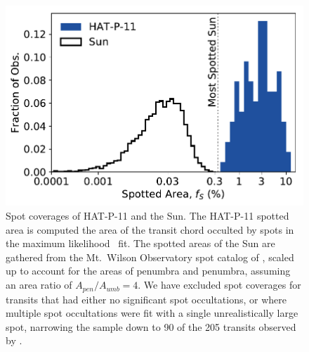 \begin{figure}
\centering
\includegraphics[scale=0.6]{stsp_hat_p_11/spotted_area.pdf}
\caption{Spot coverages of HAT-P-11 and the Sun. The HAT-P-11 spotted area is computed the area of the transit chord occulted by spots in the maximum likelihood \stsp\ fit. The spotted areas of the Sun are gathered from the Mt.~Wilson Observatory spot catalog of \citet{Howard1984}, scaled up to account for the areas of penumbra and penumbra, assuming an area ratio of $A_{pen} / A_{umb} = 4$. We have excluded spot coverages for transits that had either no significant spot occultations, or where multiple spot occultations were fit with a single unrealistically large spot, narrowing the sample down to 90 of the 205 transits observed by \kepler.}
\label{fig:spotted_area}
\end{figure}


